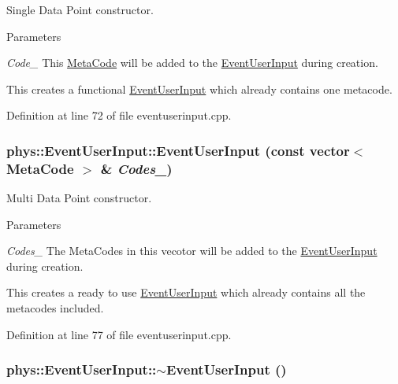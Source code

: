 Single Data Point constructor. 


\begin{DoxyParams}{Parameters}
\item[{\em Code\_\-}]This \hyperlink{classphys_1_1MetaCode}{MetaCode} will be added to the \hyperlink{classphys_1_1EventUserInput}{EventUserInput} during creation.\end{DoxyParams}
This creates a functional \hyperlink{classphys_1_1EventUserInput}{EventUserInput} which already contains one metacode. 

Definition at line 72 of file eventuserinput.cpp.

\hypertarget{classphys_1_1EventUserInput_a56ca671dd5d28396cab0d7036e08a1f1}{
\subsubsection[{EventUserInput}]{\setlength{\rightskip}{0pt plus 5cm}phys::EventUserInput::EventUserInput (const vector$<$ {\bf MetaCode} $>$ \& {\em Codes\_\-})}}
\label{d7/df5/classphys_1_1EventUserInput_a56ca671dd5d28396cab0d7036e08a1f1}


Multi Data Point constructor. 


\begin{DoxyParams}{Parameters}
\item[{\em Codes\_\-}]The MetaCodes in this vecotor will be added to the \hyperlink{classphys_1_1EventUserInput}{EventUserInput} during creation.\end{DoxyParams}
This creates a ready to use \hyperlink{classphys_1_1EventUserInput}{EventUserInput} which already contains all the metacodes included. 

Definition at line 77 of file eventuserinput.cpp.

\hypertarget{classphys_1_1EventUserInput_a5c4bb6a5016dad4cb32f51cc1d88eac3}{
\subsubsection[{$\sim$EventUserInput}]{\setlength{\rightskip}{0pt plus 5cm}phys::EventUserInput::$\sim$EventUserInput ()}}
\label{d7/df5/classphys_1_1EventUserInput_a5c4bb6a5016dad4cb32f51cc1d88eac3}


